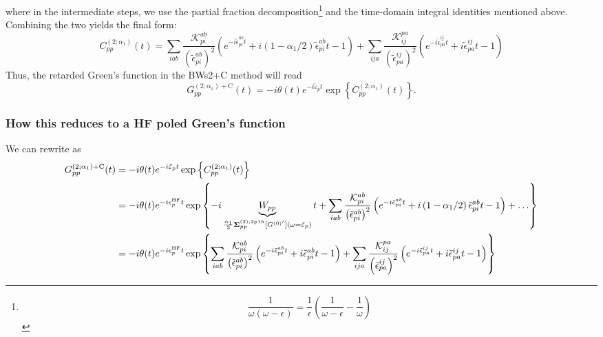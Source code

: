 where in the intermediate steps, we use the partial fraction decomposition\footnote{
\begin{equation}
    \frac{1}{\omega(\omega-\epsilon)} = \frac{1}{\epsilon} \left( \frac{1}{\omega - \epsilon} - \frac{1}{\omega} \right)
\end{equation}
} and the time-domain integral identities mentioned above.
Combining the two yields the final form:
\begin{equation}
    C_{pp}^{(2;\alpha_1)}(t) = 
    \sum_{i a b}\frac{\mathcal{K}_{pi}^{ab} }{\left(\tilde{\epsilon}_{p i}^{a b}\right)^2}\left(e^{-i \tilde{\epsilon}_{p i}^{a b} t} +i \left( 1-\alpha_1 /2\right) \tilde{\epsilon}_{p i}^{a b} t -1 \right) +\sum_{i j a} \frac{\mathcal{K}_{ij}^{pa}}{\left(\tilde{\epsilon}_{p a}^{i j}\right)^2} \left(e^{-i \tilde{\epsilon}_{p a}^{i j} t} +i \tilde{\epsilon}_{p a}^{i j} t -1 \right)
\end{equation}
Thus, the retarded Green's function in the BWs2+C method will read
\begin{equation}
G_{pp}^{\mathrm{(2;\alpha_1)+C}}(t) = -i \theta(t) e^{-i\tilde{\varepsilon}_p t} \exp\left\{C_{pp}^{(2;\alpha_1)}(t)\right\}.
\end{equation}
\subsubsection{How this reduces to a HF poled Green's function}
We can rewrite as 
\begin{align}
    G_{pp}^{\mathrm{(2;\alpha_1)+C}}(t) &= -i \theta(t) e^{-i\tilde{\varepsilon}_p t} \exp\left\{C_{pp}^{(2;\alpha_1)}(t)\right\} \\
    &= -i \theta(t) e^{-i\epsilon_p^{\rm HF} t} \exp\left\{-i\underbrace{W_{pp}}_{\frac{\alpha_1}{2}\bm{\Sigma}_{pp}^{(2),2p1h}[G^{(0)'}](\omega=\tilde{\varepsilon}_p)}t+\sum_{i a b}\frac{\mathcal{K}_{pi}^{ab} }{\left(\tilde{\epsilon}_{p i}^{a b}\right)^2}\left(e^{-i \tilde{\epsilon}_{p i}^{a b} t} +i \left( 1-\alpha_1 /2\right) \tilde{\epsilon}_{p i}^{a b} t -1 \right) +\ldots \right\} \\
&= -i \theta(t) e^{-i\epsilon_p^{\rm HF} t} \exp\left\{\sum_{i a b}\frac{\mathcal{K}_{pi}^{ab} }{\left(\tilde{\epsilon}_{p i}^{a b}\right)^2}\left(e^{-i \tilde{\epsilon}_{p i}^{a b} t} +i \tilde{\epsilon}_{p i}^{a b} t -1 \right) +\sum_{i j a} \frac{\mathcal{K}_{ij}^{pa}}{\left(\tilde{\epsilon}_{p a}^{i j}\right)^2} \left(e^{-i \tilde{\epsilon}_{p a}^{i j} t} +i \tilde{\epsilon}_{p a}^{i j} t -1 \right) \right\}
\end{align}
